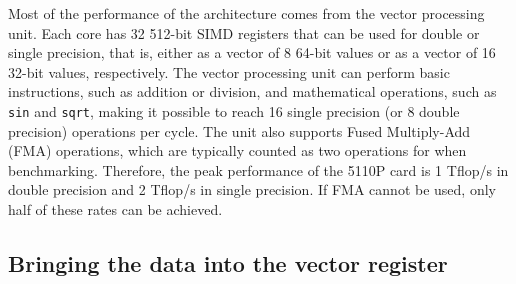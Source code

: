 \documentclass[10pt,conference,compsocconf]{IEEEtran}
\begin{document}
Most of the performance of the architecture comes from the vector
processing unit. Each core has 32 512-bit SIMD registers that can be
used for double or single precision, that is, either as a vector of 8
64-bit values or as a vector of 16 32-bit values, respectively. The
vector processing unit can perform basic instructions, such as
addition or division, and mathematical operations, such as {\tt sin} and
{\tt sqrt}, making it possible to reach 16 single precision (or 8 double precision)
operations per cycle.  
The unit also supports Fused Multiply-Add (FMA)
operations, which are typically counted as two operations for
when benchmarking. Therefore, the peak performance of the 5110P
card is 1 Tflop/s in double precision and 2 Tflop/s in single
precision. If FMA cannot be used, only half of these rates can be
achieved.


\subsection{Bringing the data into the vector register}
\end{document}

